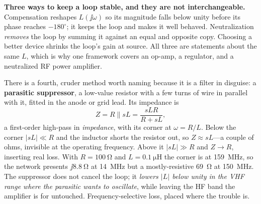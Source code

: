 \begin{controlsbox}
\textbf{Three ways to keep a loop stable, and they are not interchangeable.}
Compensation reshapes \(L(\jj\omega)\) so its magnitude falls below unity before its
phase reaches \(-180^\circ\); it keeps the loop and makes it well behaved.
Neutralization \emph{removes} the loop by summing it against an equal and opposite
copy. Choosing a better device shrinks the loop's gain at source. All three are
statements about the same \(L\), which is why one framework covers an op-amp, a
regulator, and a neutralized RF power amplifier.

There is a fourth, cruder method worth naming because it is a filter in disguise: a
\textbf{parasitic suppressor}, a low-value resistor with a few turns of wire in
parallel with it, fitted in the anode or grid lead. Its impedance is
\[
Z=R\parallel s L=\frac{sLR}{R+sL},
\]
a first-order high-pass in \emph{impedance}, with its corner at \(\omega=R/L\). Below
the corner \(|sL|\ll R\) and the inductor shorts the resistor out, so
\(Z\approx sL\)---a couple of ohms, invisible at the operating frequency. Above it
\(|sL|\gg R\) and \(Z\to R\), inserting real loss. With \(R=\SI{100}{\ohm}\) and
\(L=\SI{0.1}{\micro\henry}\) the corner is at \SI{159}{\mega\hertz}, so the network
presents \(\jj\SI{8.8}{\ohm}\) at \SI{14}{\mega\hertz} but a mostly-resistive
\SI{69}{\ohm} at \SI{150}{\mega\hertz}. The suppressor does not cancel the loop; it
\emph{lowers \(|L|\) below unity in the VHF range where the parasitic wants to
oscillate}, while leaving the HF band the amplifier is for untouched. Frequency-selective
loss, placed where the trouble is.
\end{controlsbox}


